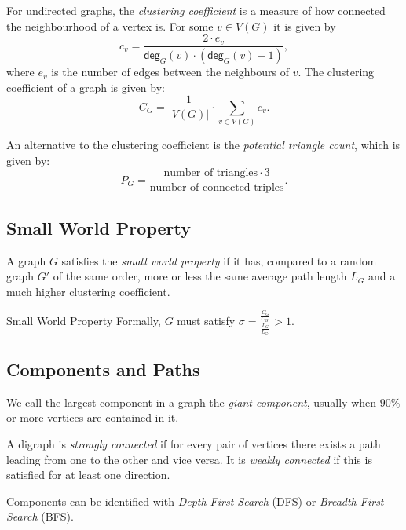 \documentclass[english]{panikzettel}
\renewcommand\deg{\textsf{deg}}
\begin{document}
For undirected graphs, the \textit{clustering coefficient} is a measure of how connected the neighbourhood of a vertex is.
For some $v \in V(G)$ it is given by $$c_v = \frac{2 \cdot e_v}{\deg_G(v)\cdot(\deg_G(v)-1)},$$
where $e_v$ is the number of edges between the neighbours of $v$.
The clustering coefficient of a graph is given by: $$C_G = \frac{1}{|V(G)|} \cdot \sum_{v \in V(G)} c_v.$$

An alternative to the clustering coefficient is the \textit{potential triangle count}, which is given by: $$P_G = \frac{\text{number of triangles} \cdot 3}{\text{number of connected triples}}.$$

\subsection{Small World Property} \label{sec:small-world}

\begin{halfboxl}
    A graph $G$ satisfies the \textit{small world property} if it has, compared to a random graph $G'$ of the same order, more or less the same average path length $L_G$ and a much higher clustering coefficient.
\end{halfboxl}%
\begin{halfboxr}
    \vspace{-\baselineskip}
     \begin{defi}{Small World Property}
        Formally, $G$ must satisfy $\sigma = \frac{\frac{C_G}{C_{G'}}}{\frac{L_G}{L_{G'}}} > 1$.
    \end{defi}
\end{halfboxr}

\subsection{Components and Paths}

We call the largest component in a graph the \emph{giant component}, usually when $90\%$ or more vertices are contained in it.

A digraph is \textit{strongly connected} if for every pair of vertices there exists a path leading from one to the other and vice versa.
It is \textit{weakly connected} if this is satisfied for at least one direction.

Components can be identified with \emph{Depth First Search} (DFS) or \emph{Breadth First Search} (BFS).
\end{document}
